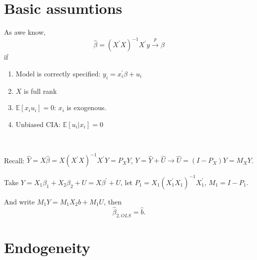 \section{Basic assumtions}
\label{sec:basic-assumtions}

As awe know, \[
    \hat{\beta} = (X^{\prime} X)^{-1}X^{\prime} y \overset{p}{\to} \beta
\]
if
\begin{enumerate}
    \item Model is correctly specified: $y_i = x_i^{\prime} \beta + u_i$
    \item $X$ is full rank
    \item $\mathbb{E}[x_i u_i] = 0$: $x_i$ is exogenous.
    \item Unbiased CIA: $\mathbb{E}[u_i|x_i] = 0$
\end{enumerate}

\begin{theorem}
    \label{thm:FWL}
    \ 

    Recall: $\hat{Y} = X \hat{\beta} = X(X^{\prime} X)^{-1}X^{\prime} Y = P_X Y$, $Y = \hat{Y} + \hat{U} \rightarrow \hat{U} = (I - P_X)Y = M_X Y$.

    Take $Y = X_1 \beta_1 + X_2 \beta_2 + U = X \beta ^{\prime} +U$,
    let $P_1 = X_1 (X_1^{\prime} X_1)^{-1}X_1^{\prime} $, $M_1 = I - P_1$.

    And write $M_1 Y = M_1 X_2 b + M_1 U$, then
    \[\hat{\beta}_{2, OLS} = \hat{b}.\]
\end{theorem}

\section{Endogeneity}
\label{sec:endogeneity}


